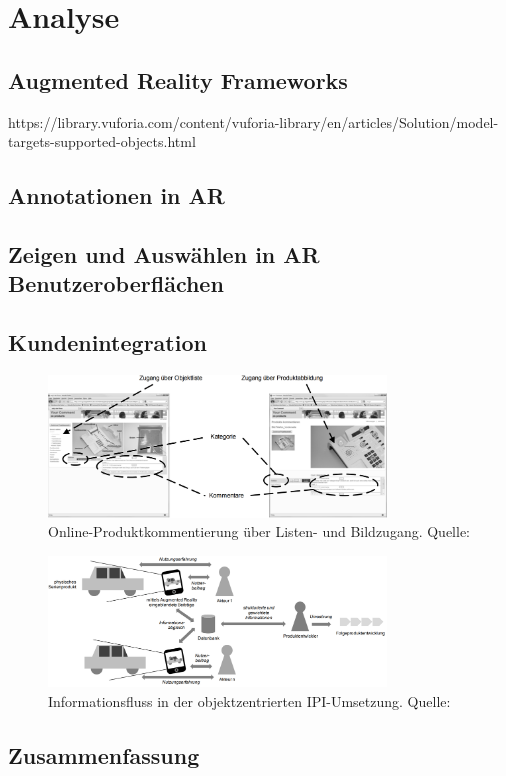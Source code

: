 \chapter{Analyse}

\section{Augmented Reality Frameworks}

https://library.vuforia.com/content/vuforia-library/en/articles/Solution/model-targets-supported-objects.html


\section{Annotationen in AR}

\cite{Brandenburg2019}
\section{Zeigen und Auswählen in AR Benutzeroberflächen}

\section{Kundenintegration}


\begin{figure}[H]
	\centering
	\includegraphics[width=0.8\textwidth]{resources/analyse/IPI_Vergleich_Listen_BildAnnotationeAnsicht.png}
	\caption{Online-Produktkommentierung über Listen- und Bildzugang. Quelle: \cite[S.~7]{Kirschner2011}}
	\label{img:ipi_list_image}
\end{figure}

\begin{figure}[H]
	\centering
	\includegraphics[width=0.8\textwidth]{resources/analyse/IPI_Objektzentriert.png}
	\caption{Informationsfluss  in der objektzentrierten IPI-Umsetzung. Quelle:\cite[S.~135]{Kirschner2012}}
	\label{img:objekt_centered_ipi}
\end{figure}





\section{Zusammenfassung}